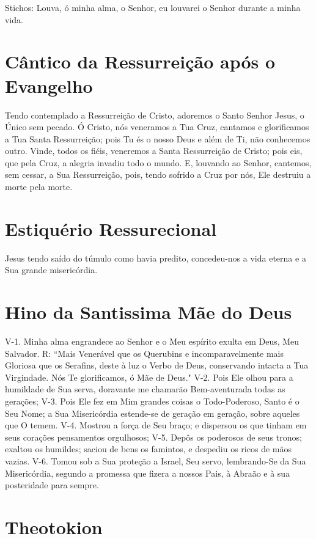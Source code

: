 \documentclass{subfiles}
\begin{document}
Stichos: Louva, ó minha alma, o Senhor, eu louvarei o Senhor durante a minha
vida.

\section*{Cântico da Ressurreição após o Evangelho}

Tendo contemplado a Ressurreição de Cristo, adoremos o Santo Senhor Jesus, o
Único sem pecado. Ó Cristo, nós veneramos a Tua Cruz, cantamos e glorificamos a
Tua Santa Ressurreição; pois Tu és o nosso Deus e além de Ti, não conhecemos
outro. Vinde, todos os fiéis, veneremos a Santa Ressurreição de Cristo; pois
eis, que pela Cruz, a alegria invadiu todo o mundo. E, louvando ao Senhor,
cantemos, sem cessar, a Sua Ressurreição, pois, tendo sofrido a Cruz por nós,
Ele destruiu a morte pela morte. 

\section*{Estiquério Ressurecional}

Jesus tendo saído do túmulo como havia predito, concedeu-nos a vida eterna e a
Sua grande misericórdia.

\section*{Hino da Santissima Mãe do Deus}

V-1. Minha alma engrandece ao Senhor e o Meu espírito exulta em
Deus, Meu Salvador.
R: “Mais Venerável que os Querubins e incomparavelmente mais
Gloriosa que os Serafins, deste à luz o Verbo de Deus, conservando intacta a
Tua Virgindade. Nós Te glorificamos, ó Mãe de Deus."
V-2. Pois Ele olhou para a humildade de Sua serva, doravante me
chamarão Bem-aventurada todas as gerações;
V-3. Pois Ele fez em Mim grandes coisas o Todo-Poderoso, Santo é o
Seu Nome; a Sua Misericórdia estende-se de geração em geração, sobre
aqueles que O temem.
V-4. Mostrou a força de Seu braço; e dispersou os que tinham em seus
corações pensamentos orgulhosos;
V-5. Depôs os poderosos de seus tronos; exaltou os humildes; saciou
de bens os famintos, e despediu os ricos de mãos vazias.
V-6. Tomou sob a Sua proteção a Israel, Seu servo, lembrando-Se da
Sua Misericórdia, segundo a promessa que fizera a nossos Pais, à Abraão e à
sua posteridade para sempre.

\section*{Theotokion}
\end{document}
